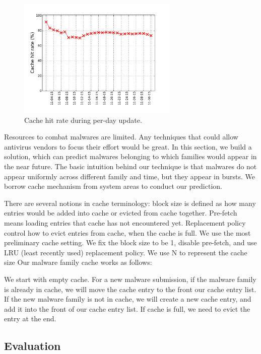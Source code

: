 \begin{figure}[t!]
\begin{center}
\includegraphics[width=3.0in]{figure/LRU_day}
\caption{Cache hit rate during per-day update.}
\label{fig:batchcache}
\end{center}
\end{figure}

Resources to combat malwares are limited. 
Any techniques that could allow antivirus vendors to focus their effort would be great. 
In this section, we build a solution, which can predict malwares belonging to which families would appear in the near future. 
The basic intuition behind our technique is that malwares do not appear uniformly across different family and time, but they appear in bursts.
We borrow cache mechanism from system areas to conduct our prediction. 

There are several notions in cache terminology: 
block size is defined as how many entries would be added into cache or evicted from cache together.
Pre-fetch means loading entries that cache has not encountered yet. 
Replacement policy control how to evict entries from cache, when the cache is full. 
We use the most preliminary cache setting. We fix the block size to be 1, disable pre-fetch, 
and use LRU (least recently used) replacement policy. We use N to represent the cache size
Our malware family cache works as follows:  

We start with empty cache. 
For a new malware submission, if the malware family is already in cache, we will move the cache entry to the front our cache entry list. 
If the new malware family is not in cache, 
we will create a new cache entry, and add it into the front of our cache entry list. 
If cache is full, we need to evict the entry at the end. 


\subsection{Evaluation}

